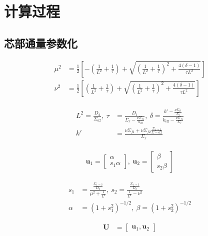 \section{计算过程}

\subsection{芯部通量参数化}

\begin{align}
    \mu^2 &= \frac{1}{2}\left[-\left(\frac{1}{L^2}+\frac{1}{\tau}\right)+\sqrt{\left(\frac{1}{L^2}+\frac{1}{\tau}\right)^2+\frac{4(\delta-1)}{\tau L^2}}\right] \\
    \nu^2 &= \frac{1}{2}\left[\left(\frac{1}{L^2}+\frac{1}{\tau}\right)+\sqrt{\left(\frac{1}{L^2}+\frac{1}{\tau}\right)^2+\frac{4(\delta-1)}{\tau L^2}}\right]
\end{align}

\begin{align}
    \begin{split}
        L^2 = \frac{D_2}{\Sigma_{a2}},\ \tau &= \frac{D_1}{\Sigma_r - \frac{\nu\Sigma_{f1}}{k_\mathrm{eff}}},\ \delta = \frac{k'-\frac{\nu\Sigma_{f1}}{\Sigma_r}}{k_\mathrm{eff}-\frac{\nu\Sigma_{f1}}{\Sigma_r}} \\
        k' &= \frac{\nu\Sigma_{f1}+\nu\Sigma_{f2}\frac{\Sigma_{1\rightarrow 2}}{\Sigma-{a2}}}{\Sigma_r}
    \end{split}
\end{align}

\begin{align}
    \pmb{u}_1 = \begin{bmatrix}
        \alpha \\
        s_1\alpha
    \end{bmatrix},\ 
    \pmb{u}_2 = \begin{bmatrix}
        \beta \\
        s_2\beta
    \end{bmatrix}
\end{align}

\begin{align}
    s_1 &= \frac{\frac{\Sigma_{1\rightarrow 2}}{D_2}}{\mu^2 + \frac{1}{L^2}},\ s_2 = \frac{\frac{\Sigma_{1\rightarrow 2}}{D_2}}{\frac{1}{L^2}-\nu^2} \\
    \alpha &= \left(1+s_1^2\right)^{-1/2},\ \beta = \left(1+s_2^2\right)^{-1/2}
\end{align}

\begin{align}
    \pmb{U} &= \begin{bmatrix}
        \pmb{u}_1, \pmb{u}_2
    \end{bmatrix}
\end{align}

